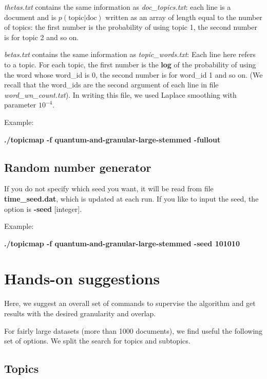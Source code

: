 \documentclass[11pt]{article}
\begin{document}
\textit{thetas.txt} contains the same information as \textit{doc\_topics.txt}: each line is a document and is $p(\textrm{topic}|\textrm{doc})$ written as an array of length equal to the number of topics: the first number is the probability of using topic 1, the second number is for topic 2 and so on.

\textit{betas.txt} contains the same information as \textit{topic\_words.txt}: Each line here refers to a topic. For each topic, the first number is the \textbf{log} of the probability of using the word whose word\_id is 0, the second number is for word\_id 1 and so on. (We recall that the word\_ids are the second argument of each line in file \textit{word\_wn\_count.txt}). In writing this file, we used Laplace smoothing with parameter $10^{-4}$.

Example:

\textbf{./topicmap -f quantum-and-granular-large-stemmed -fullout  }

\subsection{Random number generator}

If you do not specify which seed you want, it will be read from file \textbf{time\_seed.dat}, which is updated at each run.
If you like to input the seed, the option is \textbf{-seed} [integer].

Example:

\textbf{./topicmap -f quantum-and-granular-large-stemmed -seed 101010 }


\section{Hands-on suggestions}
\label{suggestions}

Here, we suggest an overall set of commands to supervise the algorithm and get results with the desired granularity and overlap.

For fairly large datasets (more than 1000 documents), we find useful the following set of options. We split the search for topics and subtopics. 

\subsection{Topics}
\end{document}
